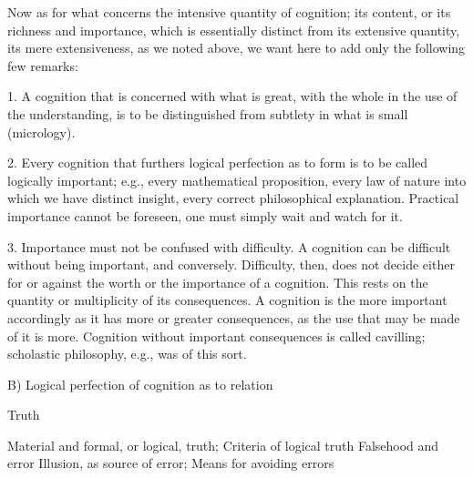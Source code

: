 Now as for what concerns the intensive quantity of cognition;
its content, or its richness and importance,
which is essentially distinct from its extensive quantity,
its mere extensiveness, as we noted above,
we want here to add only the following few remarks:

1. A cognition that is concerned with what is great,
with the whole in the use of the understanding,
is to be distinguished from subtlety in what is small (micrology).

2. Every cognition that furthers logical perfection
as to form is to be called logically important;
e.g., every mathematical proposition, every law of nature
into which we have distinct insight, every correct philosophical explanation.
Practical importance cannot be foreseen, one must simply wait and watch for it.

3. Importance must not be confused with difficulty.
A cognition can be difficult without being important, and conversely.
Difficulty, then, does not decide either for or against
the worth or the importance of a cognition.
This rests on the quantity or multiplicity of its consequences.
A cognition is the more important accordingly as
it has more or greater consequences, as the use that
may be made of it is more.
Cognition without important consequences is called cavilling;
scholastic philosophy, e.g., was of this sort.

B) Logical perfection of cognition as to relation

Truth

    Material and formal, or logical, truth;
    Criteria of logical truth
    Falsehood and error
    Illusion, as source of error;
    Means for avoiding errors

